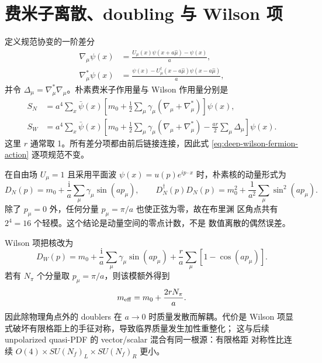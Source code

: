 \documentclass[UTF8,11pt,oneside]{ctexbook}
\begin{document}
\section{费米子离散、doubling 与 Wilson 项}

定义规范协变的一阶差分
\begin{align}
 \nabla_\mu\psi(x)&=\frac{U_\mu(x)\psi(x+a\hat\mu)-\psi(x)}{a},\\
 \nabla_\mu^*\psi(x)&=\frac{\psi(x)-U_\mu^\dagger(x-a\hat\mu)\psi(x-a\hat\mu)}{a},
\end{align}
并令 \(\Delta_\mu=\nabla_\mu^*\nabla_\mu\)。朴素费米子作用量与 Wilson
作用量分别是
\begin{align}
 S_N&=a^4\sum_x\bar\psi(x)
 \left[m_0+\frac12\sum_\mu\gamma_\mu(\nabla_\mu+\nabla_\mu^*)\right]\psi(x),\\
 S_W&=a^4\sum_x\bar\psi(x)
 \left[m_0+\frac12\sum_\mu\gamma_\mu(\nabla_\mu+\nabla_\mu^*)
 -\frac{ar}{2}\sum_\mu\Delta_\mu\right]\psi(x).
 \label{eq:deep-wilson-fermion-action}
\end{align}
这里 \(r\) 通常取 1。所有差分项都由前后链接连接，因此式
\eqref{eq:deep-wilson-fermion-action} 逐项规范不变。

在自由场 \(U_\mu=1\) 且采用平面波
\(\psi(x)=u(p)e^{ip\cdot x}\) 时，朴素核的动量形式为
\begin{equation}
 D_N(p)=m_0+\frac{\mathrm{i}}a\sum_\mu\gamma_\mu\sin(ap_\mu),
 \qquad
 D_N^\dagger(p)D_N(p)=m_0^2+\frac1{a^2}\sum_\mu\sin^2(ap_\mu).
 \label{eq:deep-naive-free-kernel}
\end{equation}
除了 \(p_\mu=0\) 外，任何分量 \(p_\mu=\pi/a\) 也使正弦为零，故在布里渊
区角点共有 \(2^4=16\) 个轻模。这个结论是动量空间的零点计数，不是
数值离散的偶然误差。

Wilson 项把核改为
\begin{equation}
 D_W(p)=m_0+\frac{\mathrm{i}}a\sum_\mu\gamma_\mu\sin(ap_\mu)
 +\frac{r}{a}\sum_\mu[1-\cos(ap_\mu)].
 \label{eq:deep-wilson-free-kernel}
\end{equation}
若有 \(N_\pi\) 个分量取 \(p_\mu=\pi/a\)，则该模额外得到
\begin{equation}
 m_{\rm eff}=m_0+\frac{2rN_\pi}{a}.
 \label{eq:deep-doubler-mass}
\end{equation}
因此除物理角点外的 doublers 在 \(a\to0\) 时质量发散而解耦。代价是
Wilson 项显式破坏有限格距上的手征对称，导致临界质量发生加性重整化；
这与后续 unpolarized quasi-PDF 的 vector/scalar 混合有同一根源：有限格距
对称性比连续 \(O(4)\times SU(N_f)_L\times SU(N_f)_R\) 更小。
\end{document}
